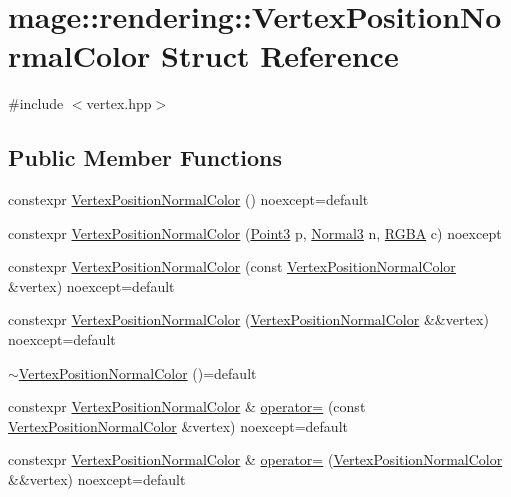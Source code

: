 \hypertarget{structmage_1_1rendering_1_1_vertex_position_normal_color}{}\section{mage\+:\+:rendering\+:\+:Vertex\+Position\+Normal\+Color Struct Reference}
\label{structmage_1_1rendering_1_1_vertex_position_normal_color}


{\ttfamily \#include $<$vertex.\+hpp$>$}

\subsection*{Public Member Functions}
\begin{DoxyCompactItemize}
\item 
constexpr \hyperlink{structmage_1_1rendering_1_1_vertex_position_normal_color_af43537af55a5ed53f4828b5e7ea0f5c2}{Vertex\+Position\+Normal\+Color} () noexcept=default
\item 
constexpr \hyperlink{structmage_1_1rendering_1_1_vertex_position_normal_color_aff58865387d88b7aa3b40b76eb476850}{Vertex\+Position\+Normal\+Color} (\hyperlink{structmage_1_1_point3}{Point3} p, \hyperlink{structmage_1_1_normal3}{Normal3} n, \hyperlink{structmage_1_1_r_g_b_a}{R\+G\+BA} c) noexcept
\item 
constexpr \hyperlink{structmage_1_1rendering_1_1_vertex_position_normal_color_ae5112aeadb68fc216e58168600417e31}{Vertex\+Position\+Normal\+Color} (const \hyperlink{structmage_1_1rendering_1_1_vertex_position_normal_color}{Vertex\+Position\+Normal\+Color} \&vertex) noexcept=default
\item 
constexpr \hyperlink{structmage_1_1rendering_1_1_vertex_position_normal_color_ac6247b996c107e6daa2204f98d38b2a9}{Vertex\+Position\+Normal\+Color} (\hyperlink{structmage_1_1rendering_1_1_vertex_position_normal_color}{Vertex\+Position\+Normal\+Color} \&\&vertex) noexcept=default
\item 
\hyperlink{structmage_1_1rendering_1_1_vertex_position_normal_color_af78e3787e0971664a9114cdf4335101c}{$\sim$\+Vertex\+Position\+Normal\+Color} ()=default
\item 
constexpr \hyperlink{structmage_1_1rendering_1_1_vertex_position_normal_color}{Vertex\+Position\+Normal\+Color} \& \hyperlink{structmage_1_1rendering_1_1_vertex_position_normal_color_ae3bdf697f0dae8b01b43c6a8249ee817}{operator=} (const \hyperlink{structmage_1_1rendering_1_1_vertex_position_normal_color}{Vertex\+Position\+Normal\+Color} \&vertex) noexcept=default
\item 
constexpr \hyperlink{structmage_1_1rendering_1_1_vertex_position_normal_color}{Vertex\+Position\+Normal\+Color} \& \hyperlink{structmage_1_1rendering_1_1_vertex_position_normal_color_a2528c797701a7102e6895d5c5d04cf27}{operator=} (\hyperlink{structmage_1_1rendering_1_1_vertex_position_normal_color}{Vertex\+Position\+Normal\+Color} \&\&vertex) noexcept=default
\end{DoxyCompactItemize}
